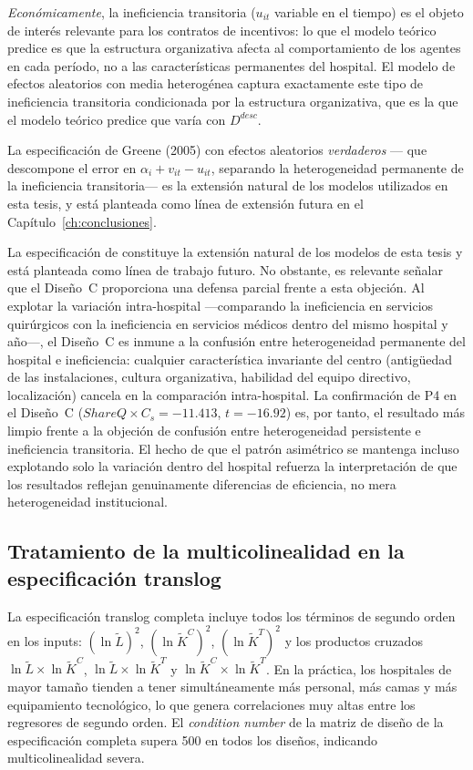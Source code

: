 \textit{Económicamente}, la ineficiencia transitoria ($u_{it}$ variable en el tiempo) es el objeto de interés relevante para los contratos de incentivos: lo que el modelo teórico predice es que la estructura organizativa afecta al comportamiento de los agentes en cada período, no a las características permanentes del hospital. El modelo de efectos aleatorios con media heterogénea \citep{battese1995,wang2002} captura exactamente este tipo de ineficiencia transitoria condicionada por la estructura organizativa, que es la que el modelo teórico predice que varía con $D^{desc}$.

La especificación de Greene (2005) con efectos aleatorios \textit{verdaderos} --- que descompone el error en $\alpha_i + v_{it} - u_{it}$, separando la heterogeneidad permanente de la ineficiencia transitoria--- es la extensión natural de los modelos utilizados en esta tesis, y está planteada como línea de extensión futura en el Capítulo~\ref{ch:conclusiones}.

La especificación de \citet{greene2005a} constituye la extensión natural de los modelos de esta tesis y está planteada como línea de trabajo futuro. No obstante, es relevante señalar que el Diseño~C proporciona una defensa parcial frente a esta objeción. Al explotar la variación intra-hospital ---comparando la ineficiencia en servicios quirúrgicos con la ineficiencia en servicios médicos dentro del mismo hospital y año---, el Diseño~C es inmune a la confusión entre heterogeneidad permanente del hospital e ineficiencia: cualquier característica invariante del centro (antigüedad de las instalaciones, cultura organizativa, habilidad del equipo directivo, localización) cancela en la comparación intra-hospital. La confirmación de P4 en el Diseño~C ($ShareQ \times C_s = -11.413$, $t = -16.92$) es, por tanto, el resultado más limpio frente a la objeción de confusión entre heterogeneidad persistente e ineficiencia transitoria. El hecho de que el patrón asimétrico se mantenga incluso explotando solo la variación dentro del hospital refuerza la interpretación de que los resultados reflejan genuinamente diferencias de eficiencia, no mera heterogeneidad institucional.

\subsection{Tratamiento de la multicolinealidad en la especificación translog}

La especificación translog completa incluye todos los términos de segundo orden en los inputs: $(\ln\tilde{L})^2$, $(\ln\tilde{K}^C)^2$, $(\ln\tilde{K}^T)^2$ y los productos cruzados $\ln\tilde{L}\times\ln\tilde{K}^C$, $\ln\tilde{L}\times\ln\tilde{K}^T$ y $\ln\tilde{K}^C\times\ln\tilde{K}^T$. En la práctica, los hospitales de mayor tamaño tienden a tener simultáneamente más personal, más camas y más equipamiento tecnológico, lo que genera correlaciones muy altas entre los regresores de segundo orden. El \textit{condition number} de la matriz de diseño de la especificación completa supera 500 en todos los diseños, indicando multicolinealidad severa.


